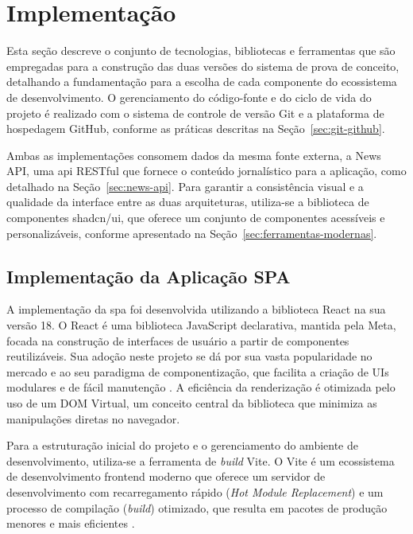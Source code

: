 \section{Implementação}
\label{sec:implementacao}

Esta seção descreve o conjunto de tecnologias, bibliotecas e ferramentas que são empregadas para a construção das duas versões do sistema de prova de conceito, detalhando a fundamentação para a escolha de cada componente do ecossistema de desenvolvimento. O gerenciamento do código-fonte e do ciclo de vida do projeto é realizado com o sistema de controle de versão Git e a plataforma de hospedagem GitHub, conforme as práticas descritas na Seção~\ref{sec:git-github}.

Ambas as implementações consomem dados da mesma fonte externa, a News API, uma \acrshort{api} RESTful que fornece o conteúdo jornalístico para a aplicação, como detalhado na Seção~\ref{sec:news-api}. Para garantir a consistência visual e a qualidade da interface entre as duas arquiteturas, utiliza-se a biblioteca de componentes shadcn/ui, que oferece um conjunto de componentes acessíveis e personalizáveis, conforme apresentado na Seção~\ref{sec:ferramentas-modernas}.

\subsection{Implementação da Aplicação SPA}
\label{ssec:implementacao_spa}

A implementação da \acrfull{spa} foi desenvolvida utilizando a biblioteca React na sua versão 18. O React é uma biblioteca JavaScript declarativa, mantida pela Meta, focada na construção de interfaces de usuário a partir de componentes reutilizáveis. Sua adoção neste projeto se dá por sua vasta popularidade no mercado e ao seu paradigma de componentização, que facilita a criação de UIs modulares e de fácil manutenção \cite{react2025}. A eficiência da renderização é otimizada pelo uso de um DOM Virtual, um conceito central da biblioteca que minimiza as manipulações diretas no navegador.

Para a estruturação inicial do projeto e o gerenciamento do ambiente de desenvolvimento, utiliza-se a ferramenta de \textit{build} Vite. O Vite é um ecossistema de desenvolvimento frontend moderno que oferece um servidor de desenvolvimento com recarregamento rápido (\textit{Hot Module Replacement}) e um processo de compilação (\textit{build}) otimizado, que resulta em pacotes de produção menores e mais eficientes \cite{vite_docs}.

